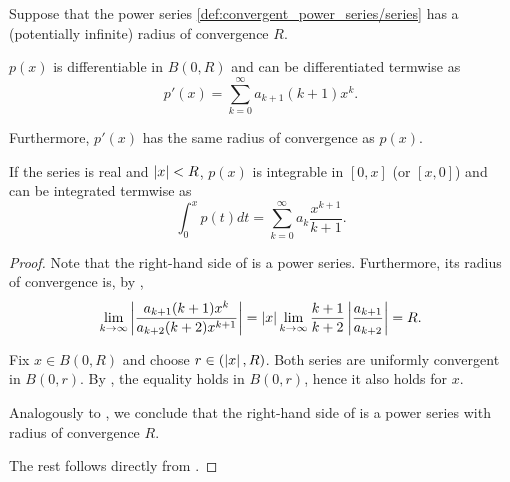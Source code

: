 \begin{theorem}\label{thm:series_termwise_operations}
  Suppose that the power series \eqref{def:convergent_power_series/series} has a (potentially infinite) radius of convergence \( R \).

  \begin{DefEnum}
     \( p(x) \) is differentiable in \( B(0, R) \) and can be differentiated termwise as
    \begin{equation}\label{thm:series_termwise_operations/derivative}
      p'(x) = \sum_{k=0}^\infty a_{k+1} (k+1) x^k.
    \end{equation}

    Furthermore, \( p'(x) \) has the same radius of convergence as \( p(x) \).

     If the series is real and \( \left\vert x \right\vert < R \), \( p(x) \) is integrable in \( [0, x] \) (or \( [x, 0] \)) and can be integrated termwise as
    \begin{equation}\label{thm:series_termwise_operations/primitive}
      \int_0^x p(t) dt = \sum_{k=0}^\infty a_k \frac {x^{k+1}} {k+1}.
    \end{equation}
  \end{DefEnum}
\end{theorem}
\begin{proof}
   Note that the right-hand side of  is a power series. Furthermore, its radius of convergence is, by ,
  \begin{equation*}
    \lim_{k \to \infty} \left\vert \frac {a_{k+1} (k+1) x^k} {a_{k+2} (k+2) x^{k+1}} \right\vert
    =
    \left\vert x \right\vert \lim_{k \to \infty} \frac {k+1} {k+2} \left\vert \frac {a_{k+1}} {a_{k+2}} \right\vert
    =
    R.
  \end{equation*}

  Fix \( x \in B(0, R) \) and choose \( r \in (\left\vert x \right\vert, R) \). Both series are uniformly convergent in \( B(0, r) \). By , the equality  holds in \( B(0, r) \), hence it also holds for \( x \).

   Analogously to , we conclude that the right-hand side of  is a power series with radius of convergence \( R \).

  The rest follows directly from .
\end{proof}
